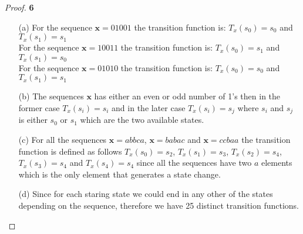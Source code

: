 \documentclass[11pt]{article}
\begin{document}
		\begin{proof}{\textbf{6}}
			\begin{itemize}
				\item[(a)] For the sequence $\bm{x}=01001$ the transition function is: $T_x(s_0) = s_0$ and $T_x(s_1) = s_1$ \\
				For the sequence $\bm{x}=10011$ the transition function is: $T_x(s_0) = s_1$ and $T_x(s_1) = s_0$\\
				For the sequence $\bm{x}=01010$ the transition function is: $T_x(s_0) = s_0$ and $T_x(s_1) = s_1$
				\item[(b)] The sequences $\bm{x}$ has either an even or odd number of 1's then in the former case $T_x(s_i) = s_i$ and in the later case $T_x(s_i) = s_j$ where $s_i$ and $s_j$ is either $s_0$ or $s_1$ which are the two available states.
				\item[(c)] For all the sequences $\bm{x} = abbca$, $\bm{x} = babac$ and $\bm{x} = ccbaa$ the transition function is defined as follows $T_x(s_0)=s_2$, $T_x(s_1)=s_3$, $T_x(s_2)=s_4$, $T_x(s_3)=s_4$ and $T_x(s_4)=s_4$ since all the sequences have two $a$ elements which is the only element that generates a state change.
				\item[(d)] Since for each staring state we could end in any other of the states depending on the sequence, therefore we have 25 distinct transition functions.
 			\end{itemize}
		\end{proof}
\cleardoublepage
\end{document}
